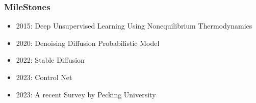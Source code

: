\begin{frame}
    \frametitle{MileStones}
    \begin{itemize}
        \item 2015: Deep Unsupervised Learning Using Nonequilibrium Thermodynamics \cite{sohl-dicksteinDeepUnsupervisedLearning2015}
        \item 2020: Denoising Diffusion Probabilistic Model \cite{hoDenoisingDiffusionProbabilistic2020}
        \item 2022: Stable Diffusion \cite{rombachHighResolutionImageSynthesis2022}
        \item 2023: Control Net \cite{zhangAddingConditionalControl2023}
        \item 2023: A recent Survey by Pecking University \cite{yangDiffusionModelsComprehensive2023}
    \end{itemize}
\end{frame}